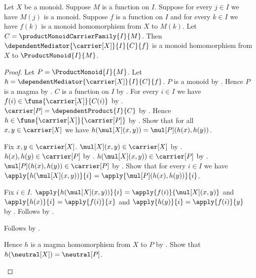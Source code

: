 \begin{theorem}\label{product_monoid_mediator_hom}
    Let $X$ be a monoid.
    Suppose $M$ is a function on $I$.
    Suppose for every $j\in I$ we have $M(j)$ is a monoid.
    Suppose $f$ is a function on $I$ and for every $k\in I$ we have
        $f(k)$ is a monoid homomorphism from $X$ to $M(k)$.
    Let $C=\productMonoidCarrierFamily{I}{M}$.
    Then $\dependentMediator{\carrier[X]}{I}{C}{f}$ is a monoid
        homomorphism from $X$ to $\ProductMonoid{I}{M}$.
\end{theorem}
\begin{proof}
    Let $P=\ProductMonoid{I}{M}$.
    Let $h=\dependentMediator{\carrier[X]}{I}{C}{f}$.
    $P$ is a monoid by .
    Hence $P$ is a magma by .
    $C$ is a function on $I$ by
        .
    For every $i\in I$ we have $f(i)\in\funs{\carrier[X]}{C(i)}$ by
        .
    $\carrier[P]=\dependentProduct{I}{C}$ by
        .
    Hence $h\in\funs{\carrier[X]}{\carrier[P]}$ by
        .
    Show that for all $x,y\in\carrier[X]$ we have
        $h(\mul[X](x,y))=\mul[P](h(x),h(y))$.
    \begin{subproof}
        Fix $x,y\in\carrier[X]$.
        $\mul[X](x,y)\in\carrier[X]$ by
            .
        $h(x),h(y)\in\carrier[P]$ by .
        $h(\mul[X](x,y))\in\carrier[P]$ by .
        $\mul[P](h(x),h(y))\in\carrier[P]$ by
            .
        Show that for every $i\in I$ we have
            $\apply{h(\mul[X](x,y))}{i}
                =\apply{\mul[P](h(x),h(y))}{i}$.
        \begin{subproof}
            Fix $i\in I$.
            $\apply{h(\mul[X](x,y))}{i}=\apply{f(i)}{\mul[X](x,y)}$ and
                $\apply{h(x)}{i}=\apply{f(i)}{x}$ and
                $\apply{h(y)}{i}=\apply{f(i)}{y}$ by
                .
            Follows by
                .
        \end{subproof}
        Follows by
            .
    \end{subproof}
    Hence $h$ is a magma homomorphism from $X$ to $P$ by
        .
    Show that $h(\neutral[X])=\neutral[P]$.
    \begin{subproof}

\end{subproof}
\end{proof}
